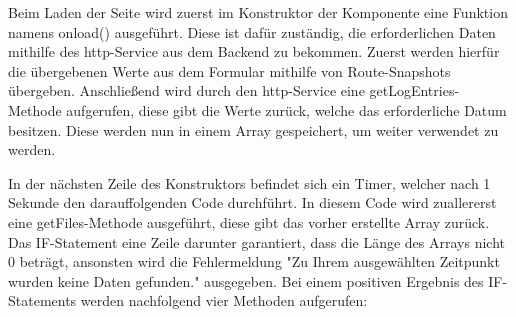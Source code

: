 Beim Laden der Seite wird zuerst im Konstruktor der Komponente eine Funktion namens onload() ausgeführt. Diese ist dafür zuständig, die erforderlichen Daten mithilfe des http-Service aus dem Backend zu bekommen. Zuerst werden hierfür die übergebenen Werte aus dem Formular mithilfe von Route-Snapshots übergeben. Anschließend wird durch den http-Service eine getLogEntries-Methode aufgerufen, diese gibt die Werte zurück, welche das erforderliche Datum besitzen. Diese werden nun in einem Array gespeichert, um weiter verwendet zu werden.
 
In der nächsten Zeile des Konstruktors befindet sich ein Timer, welcher nach 1 Sekunde den darauffolgenden Code durchführt. In diesem Code wird zuallererst eine getFiles-Methode ausgeführt, diese gibt das vorher erstellte Array zurück. Das IF-Statement eine Zeile darunter garantiert, dass die Länge des Arrays nicht 0 beträgt, ansonsten wird die Fehlermeldung "Zu Ihrem ausgewählten Zeitpunkt wurden keine Daten gefunden." ausgegeben. Bei einem positiven Ergebnis des IF-Statements werden nachfolgend vier Methoden aufgerufen:
 

